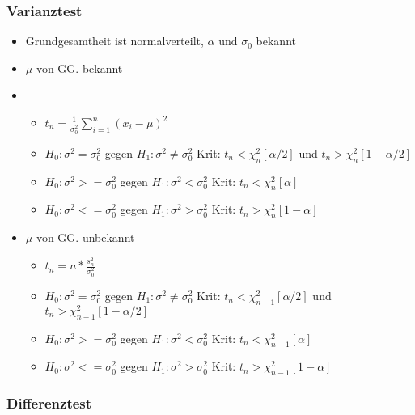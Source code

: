 \documentclass[a4paper]{article}
\begin{document}
\begin{landscape}
\begin{multicols}{4}
        \subsubsection*{Varianztest}
        \begin{itemize}[noitemsep,nolistsep,leftmargin=*]
            \item Grundgesamtheit ist normalverteilt, $\alpha$ und $\sigma_0$ bekannt
            \item $\mu $ von GG. bekannt
            \item \begin{itemize}[noitemsep,nolistsep,leftmargin=*]
            \item $t_n= \frac{1}{\sigma^2_0} \sum^n_{i=1} (x_i-\mu)^2$
            \item $H_0: \sigma^2 = \sigma^2_0$ gegen $H_1: \sigma^2 \neq \sigma^2_0$ Krit: $t_n < \chi^2_n[\alpha/2]$ und $t_n > \chi^2_n[1-\alpha/2]$
            \item $H_0: \sigma^2 >= \sigma^2_0$ gegen $H_1: \sigma^2 < \sigma^2_0$ Krit: $t_n < \chi^2_n[\alpha]$ 
            \item $H_0: \sigma^2 <= \sigma^2_0$ gegen $H_1: \sigma^2 > \sigma^2_0$ Krit: $t_n > \chi^2_n[1-\alpha]$ 
            \end{itemize}
            \item $\mu $ von GG. unbekannt
            \begin{itemize}[noitemsep,nolistsep,leftmargin=*]
            \item $t_n= n*\frac{s^2_n}{\sigma^2_0}$
            \item $H_0: \sigma^2 = \sigma^2_0$ gegen $H_1: \sigma^2 \neq \sigma^2_0$ Krit: $t_n < \chi^2_{n-1}[\alpha/2]$ und $t_n > \chi^2_{n-1}[1-\alpha/2]$
            \item $H_0: \sigma^2 >= \sigma^2_0$ gegen $H_1: \sigma^2 < \sigma^2_0$ Krit: $t_n < \chi^2_{n-1}[\alpha]$ 
            \item $H_0: \sigma^2 <= \sigma^2_0$ gegen $H_1: \sigma^2 > \sigma^2_0$ Krit: $t_n > \chi^2_{n-1}[1-\alpha]$ 
            \end{itemize}
        \end{itemize}

        \subsubsection*{Differenztest}
        

\end{multicols}
\end{landscape}
\end{document}
